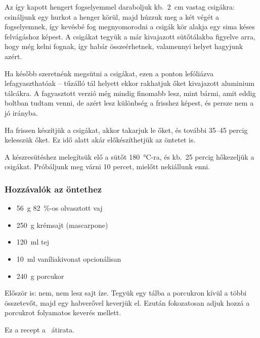 Az így kapott hengert fogselyemmel daraboljuk kb.~\qty{2}{\cm} vastag csigákra: csináljunk egy hurkot a henger körül, majd húzzuk meg a két végét a fogselyemnek, így kevésbé fog megnyomorodni a csigák kör alakja egy sima késes felvágáshoz képest. A csigákat tegyük a már kivajazott sütőtálakba figyelve arra, hogy még kelni fognak, így habár összeérhetnek, valamennyi helyet hagyjunk azért.

Ha később szeretnénk megsütni a csigákat, ezen a ponton lefóliázva lefagyaszthatóak -- tűzálló tál helyett ekkor rakhatjuk őket kivajazott aluminium tálcákra. A fagyasztott verzió még mindig finomabb lesz, mint bármi, amit eddig boltban tudtam venni, de azért lesz különbség a frisshez képest, és persze nem a jó irányba.

Ha frissen készítjük a csigákat, akkor takarjuk le őket, és további \numrange{35}{45} percig kelesszük őket. Ez idő alatt akár előkészíthetjük az öntetet is.

A készresütéshez melegítsük elő a sütőt \qty{180}{\celsius}-ra, és kb.~\num{25} percig hőkezeljük a csigákat. Próbáljunk meg várni \num{10} percet, mielőtt nekiállunk enni.

\subsubsection*{Hozzávalók az öntethez}
\begin{itemize}
    \item \qty{56}{\g} \qty{82}{\percent}-os olvasztott vaj
    \item \qty{250}{\g} krémsajt (mascarpone)
    \item \qty{120}{\ml} tej
    \item \qty{10}{\ml} vaníliakivonat opcionálisan
    \item \qty{240}{\g} porcukor
\end{itemize}

Először is: nem, nem lesz sajt íze. Tegyük egy tálba a porcukron kívül a többi összetevőt, majd egy habverővel keverjük el. Ezután fokozatosan adjuk hozzá a porcukrot folyamatos keverés mellett.

Ez a recept a~\cite{tasty_fahejas_csiga} átirata.
